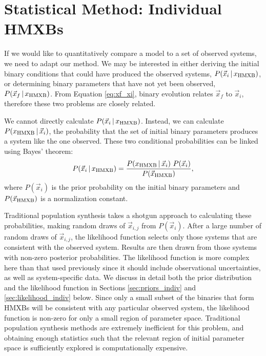 \documentclass[12pt, preprint]{aastex}
\newcommand{\given}{\,|\,}
\begin{document}
\section{Statistical Method: Individual HMXBs} \label{sec:stats_individual}

If we would like to quantitatively compare a model to a set of observed systems, we need to adapt our method. We may be interested in either deriving the initial binary conditions that could have produced the observed systems, $P(\vec{x}_i \given x_{\rm HMXB})$, or determining binary parameters that have not yet been observed, $P(\vec{x}_f \given x_{\rm HMXB})$. From Equation \ref{eq:xf_xi}, binary evolution relates $\vec{x}_f$ to $\vec{x}_i$, therefore these two problems are closely related. 




We cannot directly calculate $P(\vec{x}_i \given x_{\rm HMXB})$. Instead, we can calculate $P(x_{\rm HMXB} \given \vec{x}_i)$, the probability that the set of initial binary parameters produces a system like the one observed. These two conditional probabilities can be linked using Bayes' theorem:
\begin{equation}
P(\vec{x}_i \given x_{\rm HMXB}) = \frac{P(x_{\rm HMXB} \given \vec{x}_i)\ P(\vec{x}_i)}{P(\vec{x}_{\rm HMXB})}, \label{eq:bayes}
\end{equation}
where $P(\vec{x}_i)$ is the prior probability on the initial binary parameters and $P(\vec{x}_{\rm HMXB})$ is a normalization constant. 

Traditional population synthesis takes a shotgun approach to calculating these probabilities, making random draws of $\vec{x}_{i,j}$ from $P(\vec{x}_i)$. After a large number of random draws of $\vec{x}_{i,j}$, the likelihood function selects only those systems that are consistent with the observed system. Results are then drawn from those systems with non-zero posterior probabilities. The likelihood function is more complex here than that used previously since it should include observational uncertainties, as well as system-specific data. We discuss in detail both the prior distribution and the likelihood function in Sections \ref{sec:priors_indiv} and \ref{sec:likelihood_indiv} below. Since only a small subset of the binaries that form HMXBs will be consistent with any particular observed system, the likelihood function is non-zero for only a small region of parameter space. Traditional population synthesis methods are extremely inefficient for this problem, and obtaining enough statistics such that the relevant region of initial parameter space is sufficiently explored is computationally expensive.
\end{document}
